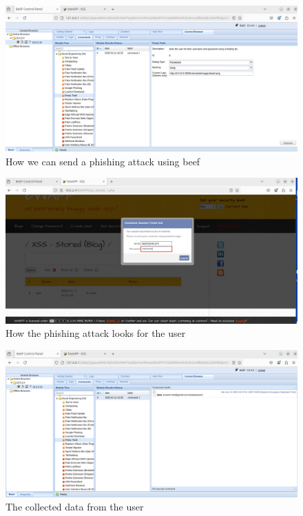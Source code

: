 \documentclass{article}
\begin{document}
\begin{figure}
    \centering
    \includegraphics[width=1\linewidth]{Figures/beef/send-pretty-theft.png}
    \caption{\label{fig:send-pretty-theft}How we can send a phishing attack using beef}
\end{figure}

\begin{figure}
    \centering
    \includegraphics[width=1\linewidth]{Figures/beef/filling-phishing-attempt.png}
    \caption{\label{fig:filling-phishing-attempt}How the phishing attack looks for the user}
\end{figure}

\begin{figure}
    \centering
    \includegraphics[width=1\linewidth]{Figures/beef/data-received.png}
    \caption{\label{fig:data-received}The collected data from the user}
\end{figure}
\end{document}
